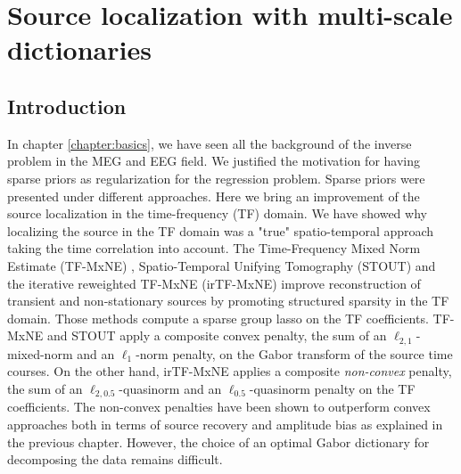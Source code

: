 
\chapter{Source localization with multi-scale dictionaries} %

\label{chapter:multiscale} %
\noindent\makebox[\linewidth]{\rule{0.75\paperwidth}{0.4pt}}
\noindent\makebox[\linewidth]{\rule{0.75\paperwidth}{0.4pt}}

\localtableofcontents %

\noindent\makebox[\linewidth]{\rule{0.75\paperwidth}{0.4pt}}
\noindent\makebox[\linewidth]{\rule{0.75\paperwidth}{0.4pt}}
\newpage

\section{Introduction}
In chapter \ref{chapter:basics}, we have seen all the background of the inverse problem in the MEG and EEG field. We justified the motivation for having sparse priors as regularization for the regression problem. Sparse priors were presented under different approaches. Here we bring an improvement of the source localization in the time-frequency (TF) domain. We have showed why localizing the source in the TF domain was a "true" spatio-temporal approach taking the time correlation into account.
The Time-Frequency Mixed Norm Estimate (TF-MxNE) \cite{Alex13}, Spatio-Temporal Unifying Tomography (STOUT) \cite{castano2015solving} and the iterative reweighted TF-MxNE (irTF-MxNE) \cite{daniel15} improve reconstruction of transient and non-stationary sources by promoting structured sparsity in the TF domain. Those methods compute a sparse group lasso on the TF coefficients. TF-MxNE and STOUT apply a composite convex penalty, the sum of an $\ell_{2, 1}$-mixed-norm and an $\ell_{1}$-norm penalty, on the Gabor transform of the source time courses. On the other hand, irTF-MxNE applies a composite \emph{non-convex} penalty, the sum of an $\ell_{2, 0.5}$-quasinorm and an $\ell_{0.5}$-quasinorm penalty on the TF coefficients.
The non-convex penalties have been shown to outperform convex approaches both in terms of source recovery and amplitude bias \cite{candes2008enhancing,daubechies2010iteratively} as explained in the previous chapter. However, the choice of an optimal Gabor dictionary for decomposing the data remains difficult.

